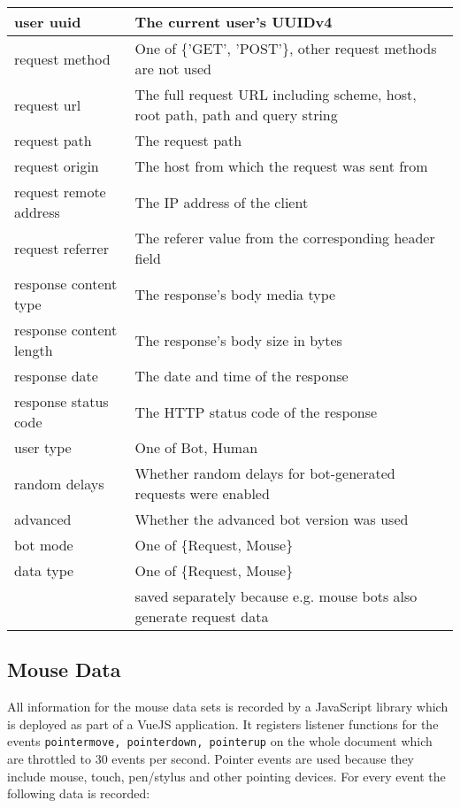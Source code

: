 \documentclass[
    fontsize=12pt,
    headings=small,
    parskip=half,           %
    bibliography=totoc,
    numbers=noenddot,       %
    open=any,               %
    final                   %
]{scrreprt}
\begin{document}
\begin{table}[]
\begin{tabular}{|l|l|}
\hline
user uuid & The current user's UUIDv4 \\ \hline
request method & One of \{'GET', 'POST'\}, other request methods are not used \\ \hline
request url & The full request URL including scheme, host, root path, path and query string \\ \hline
request path & The request path \\ \hline
request origin & The host from which the request was sent from \\ \hline
request remote address & The IP address of the client \\ \hline
request referrer & The referer value from the corresponding header field \\ \hline
response content type & The response's body media type \\ \hline
response content length & The response's body size in bytes \\ \hline
response date & The date and time of the response \\ \hline
response status code & The HTTP status code of the response \\ \hline
user type & One of {Bot, Human} \\ \hline
random delays & Whether random delays for bot-generated requests were enabled \\ \hline
advanced & Whether the advanced bot version was used \\ \hline
bot mode & One of \{Request, Mouse\} \\ \hline
data type & One of \{Request, Mouse\} \\ & saved separately because e.g. mouse bots also generate request data \\ \hline

\end{tabular}
\end{table}

\subsection{Mouse Data}

All information for the mouse data sets is recorded by a JavaScript library which is deployed as part of a VueJS application. It registers listener functions for the events \lstinline{pointermove, pointerdown, pointerup} on the whole document which are throttled to $30$ events per second. Pointer events are used because they include mouse, touch, pen/stylus and other pointing devices. For every event the following data is recorded:
\end{document}
